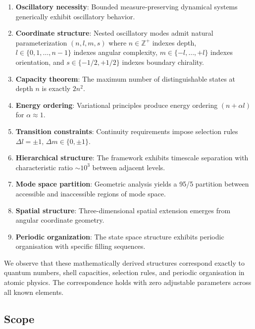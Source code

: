 \documentclass[11pt,a4paper]{article}
\theoremstyle{remark}
\begin{document}
\begin{enumerate}
    \item \textbf{Oscillatory necessity}: Bounded measure-preserving dynamical systems generically exhibit oscillatory behavior.

    \item \textbf{Coordinate structure}: Nested oscillatory modes admit natural parameterization $(n, l, m, s)$ where $n \in \mathbb{Z}^+$ indexes depth, $l \in \{0, 1, \ldots, n-1\}$ indexes angular complexity, $m \in \{-l, \ldots, +l\}$ indexes orientation, and $s \in \{-1/2, +1/2\}$ indexes boundary chirality.

    \item \textbf{Capacity theorem}: The maximum number of distinguishable states at depth $n$ is exactly $2n^2$.

    \item \textbf{Energy ordering}: Variational principles produce energy ordering $(n + \alpha l)$ for $\alpha \approx 1$.

    \item \textbf{Transition constraints}: Continuity requirements impose selection rules $\Delta l = \pm 1$, $\Delta m \in \{0, \pm 1\}$.

    \item \textbf{Hierarchical structure}: The framework exhibits timescale separation with characteristic ratio $\sim 10^3$ between adjacent levels.

    \item \textbf{Mode space partition}: Geometric analysis yields a 95/5 partition between accessible and inaccessible regions of mode space.

    \item \textbf{Spatial structure}: Three-dimensional spatial extension emerges from angular coordinate geometry.

    \item \textbf{Periodic organization}: The state space structure exhibits periodic organisation with specific filling sequences.
\end{enumerate}

We observe that these mathematically derived structures correspond exactly to quantum numbers, shell capacities, selection rules, and periodic organisation in atomic physics. The correspondence holds with zero adjustable parameters across all known elements.

\subsection{Scope}
\end{document}
